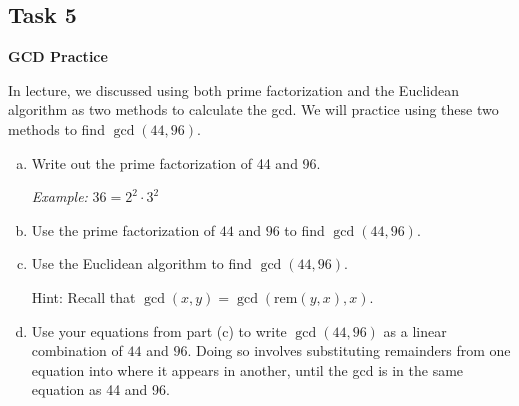 \documentclass[12pt,letterpaper]{article}
\newif\ifsol
\newcommand{\solu}[2]{ \begin{mdframed} \ifsol #2 \else \vspace{#1} \fi \end{mdframed} }
\begin{document}
    \pagebreak
    \subsection*{Task 5}
    \textbf{GCD Practice}
    
    In lecture, we discussed using both prime factorization and the Euclidean algorithm as two methods to calculate the gcd. We will practice using these two methods to find $\gcd(44, 96)$.
    
    \begin{enumerate}[a.]
    \item Write out the prime factorization of 44 and 96.
    
    \textit{Example:} $36 = 2^2 \cdot 3^2$
    \solu{1cm}{$44 = 2^2 \cdot 11$
    
    $96 = 2^5 \cdot 3$}
    
    \item Use the prime factorization of $44$ and $96$ to find $\gcd(44, 96)$.
    \solu{1cm}{
    The gcd involves all shared primes with the minimum multiplicity, thus, $\gcd(44, 96) = 2^2=4$.
    }
    \item Use the Euclidean algorithm to find $\gcd(44, 96)$.
    
    Hint: Recall that $\gcd(x, y) = \gcd(\text{rem}(y, x), x)$.
    
    \solu{2cm}{
    \begin{align*}
        96 &= 2 \cdot 44 + 8\\
        44 &= 5 \cdot 8 + 4\\
        8 &= 2 \cdot 4 + 0
    \end{align*}
    Thus, $\gcd(44, 96) = 4$.
    }
    \item Use your equations from part (c) to write $\gcd(44, 96)$ as a linear combination of $44$ and $96$. Doing so involves substituting remainders from one equation into where it appears in another, until the gcd is in the same equation as 44 and 96.
    
    \solu{2cm}{
    From parts $a$ and $b$, we found that $\gcd(44, 96)$. We can use the extended Euclidean Algorithm to write $4$ as a linear combination of $44$ and $96$. 
    \begin{align*}
        4 &= 44 - 5 \cdot 8\\
        4 &= 44 - 5 \cdot (96 - 2 \cdot 44)\\
        4 &= 44 - 5 \cdot 96 + 10 \cdot 44\\
        4 &= 11 \cdot 44 - 5 \cdot 96
    \end{align*}
    
    Alternatively, starting from the first equation:
    \begin{align*}
        8 &= 96 - 2 \cdot 44 \\
        44 &= 5 \cdot (96 - 2 \cdot 44) + 4\\
        44 &= 5 \cdot 96 - 10 \cdot 44 + 4\\
        4 &= 11 \cdot 44 - 5 \cdot 96
    \end{align*}
    
    }
    \end{enumerate}
    
\end{document}
